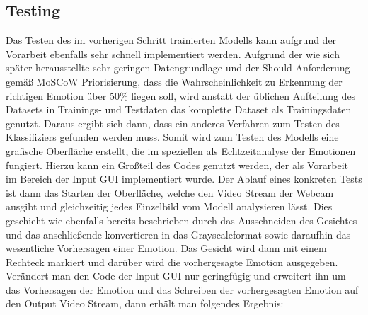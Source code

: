 \documentclass[12pt, a4paper]{scrbook}
\begin{document}
\subsection{Testing}
Das Testen des im vorherigen Schritt trainierten Modells kann aufgrund der Vorarbeit ebenfalls sehr schnell implementiert werden. Aufgrund der wie sich später herausstellte sehr geringen Datengrundlage und der Should-Anforderung gemäß MoSCoW Priorisierung, dass die Wahrscheinlichkeit zu Erkennung der richtigen Emotion über 50\% liegen soll, wird anstatt der üblichen Aufteilung des Datasets in Trainings- und Testdaten das komplette Dataset als Trainingsdaten genutzt. Daraus ergibt sich dann, dass ein anderes Verfahren zum Testen des Klassifiziers gefunden werden muss. Somit wird zum Testen des Modells eine grafische Oberfläche erstellt, die im speziellen als Echtzeitanalyse der Emotionen fungiert. Hierzu kann ein Großteil des Codes genutzt werden, der als Vorarbeit im Bereich der Input GUI implementiert wurde. Der Ablauf eines konkreten Tests ist dann das Starten der Oberfläche, welche den Video Stream der Webcam ausgibt und gleichzeitig jedes Einzelbild vom Modell analysieren lässt. Dies geschieht wie ebenfalls bereits beschrieben durch das Ausschneiden des Gesichtes und das anschließende konvertieren in das Grayscaleformat sowie daraufhin das wesentliche Vorhersagen einer Emotion. Das Gesicht wird dann mit einem Rechteck markiert und darüber wird die vorhergesagte Emotion ausgegeben. Verändert man den Code der Input GUI nur geringfügig und erweitert ihn um das Vorhersagen der Emotion und das Schreiben der vorhergesagten Emotion auf den Output Video Stream, dann erhält man folgendes Ergebnis:

\end{document}
